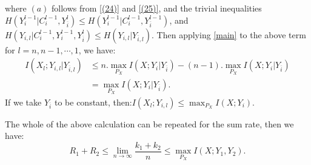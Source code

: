 \documentclass[runningheads]{llncs}
\newcommand{\parbreak}{ \vspace{0.3 em}}
\begin{document}
where $(a)$ follows from \eqref{(24)} and \eqref{(25)}, and the trivial inequalities\linebreak $H(Y_i^{l-1} | C_i^{l-1}, Y_{\overline{i}}^{l}) 
\leq H(Y_i^{l-1} | C_i^{l-1}, Y_{\overline{i}}^{l-1})$, and\linebreak $H(Y_{i,l} | C_i^{l-1}, Y_i^{l-1}, Y_{\overline{i}}^{l}) 
\leq H(Y_{i,l} | Y_{\overline{i},l})$. Then applying \eqref{main} to the above term for $l = n, n-1, \cdots, 1$, we have:
\begin{align*}
    I(X_l; Y_{i,l} | Y_{\overline{i},l})&\leq n.\max_{P_X}I(X; Y_i | Y_{\overline{i}})-(n-1).\max_{P_X} I(X; Y_i | Y_{\overline{i}})\\
    & = \max_{P_X} I(X; Y_i | Y_{\overline{i}}).
\end{align*}
If we take $Y_{\overline{i}}$ to be constant, then:\linebreak $I(X_l;Y_{i,l})\leq\max_{P_X} I(X;Y_i)$.

\parbreak The whole of the above calculation can be repeated for the sum rate, then we have: 
\[ R_1 + R_2 \leq \lim_{n\to\infty} \frac{k_1+k_2}{n}\leq\max_{P_X} I(X;Y_1,Y_2).\]
\end{document}
